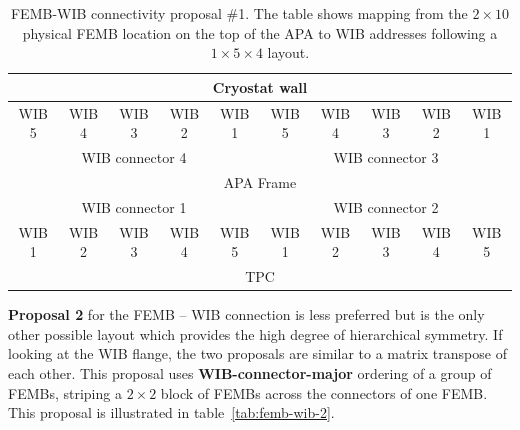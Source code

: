 \documentclass[pdftex,12pt,letter]{article}
\begin{document}
\begin{table}[htp]
  \label{tab:femb-wib-1}
  \centering
  \begin{tabular}[h]{|c|c|c|c|c|c|c|c|c|c|}
    \hline
    \multicolumn{10}{|c|}{Cryostat wall} \\
    \hline
    WIB 5 & WIB 4 & WIB 3 & WIB 2 & WIB 1 & WIB 5 & WIB 4 & WIB 3 & WIB 2 & WIB 1 \\
    \multicolumn{5}{|c|}{WIB connector 4} & \multicolumn{5}{c|}{WIB connector 3} \\
    \hline
    \multicolumn{10}{|c|}{APA Frame} \\
    \hline
    \multicolumn{5}{|c|}{WIB connector 1} & \multicolumn{5}{c|}{WIB connector 2} \\
    WIB 1 & WIB 2 & WIB 3 & WIB 4 & WIB 5 & WIB 1 & WIB 2 & WIB 3 & WIB 4 & WIB 5\\
    \hline
    \multicolumn{10}{|c|}{TPC} \\
    \hline
  \end{tabular}
  \caption{FEMB-WIB connectivity proposal \#1.  The table shows mapping from the $2\times10$ physical FEMB location on the top of the APA to WIB addresses following a $1\times5\times4$ layout.}
\end{table}



\textbf{Proposal 2} for the FEMB -- WIB connection is less preferred
but is the only other possible layout which provides the high degree
of hierarchical symmetry.  If looking at the WIB flange, the two
proposals are similar to a matrix transpose of each other.  This
proposal uses \textbf{WIB-connector-major} ordering of a group of
FEMBs, striping a $2\times2$ block of FEMBs across the connectors of
one FEMB.  This proposal is illustrated  in table~\ref{tab:femb-wib-2}.
\end{document}
